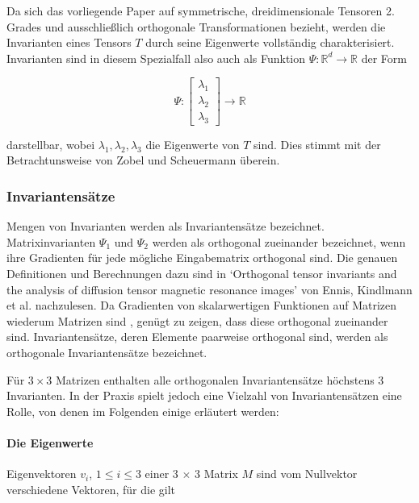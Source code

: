 \documentclass[a4paper,fontsize=12pt,toc=bib,halfparskip]{scrartcl}
\begin{document}
Da sich das vorliegende Paper auf symmetrische, dreidimensionale Tensoren 2. Grades und ausschlie{\ss}lich orthogonale Transformationen bezieht, werden die Invarianten eines Tensors $T$ durch seine Eigenwerte vollst\"andig charakterisiert. Invarianten sind in diesem Spezialfall also auch als Funktion $\Psi: \mathbb{R}^d \rightarrow \mathbb{R}$ der Form

\begin{equation}
	\Psi:
	\begin{bmatrix}
	\lambda_1\\
	\lambda_2\\
	\lambda_3
	\end{bmatrix}
	\rightarrow \mathbb{R}
\end{equation}

darstellbar, wobei $\lambda_1, \lambda_2, \lambda_3$ die Eigenwerte von $T$ sind. Dies stimmt mit der Betrachtunsweise von Zobel und Scheuermann \cite{zobel2017extremal} \"uberein.

\subsubsection{Invariantens\"atze} 
Mengen von Invarianten werden als Invariantens\"atze bezeichnet.
Matrixinvarianten $\Psi_1$ und $\Psi_2$ werden als orthogonal zueinander bezeichnet, wenn ihre Gradienten f\"ur jede m\"ogliche Eingabematrix orthogonal sind. Die genauen Definitionen und Berechnungen dazu sind in `Orthogonal tensor invariants and the analysis of diffusion tensor magnetic resonance images' von Ennis, Kindlmann et al. \cite{ennis2006orthogonal} nachzulesen. Da Gradienten von skalarwertigen Funktionen auf Matrizen wiederum Matrizen sind \cite[S.~137]{ennis2006orthogonal}, gen\"ugt zu zeigen, dass diese orthogonal zueinander sind. Invariantens\"atze, deren Elemente paarweise orthogonal sind, werden als orthogonale Invariantens\"atze bezeichnet.

F\"ur $3\times 3$ Matrizen enthalten alle orthogonalen Invariantens\"atze h\"ochstens 3 Invarianten. In der Praxis spielt jedoch eine Vielzahl von Invariantens\"atzen eine Rolle, von denen im Folgenden einige erl\"autert werden:

\paragraph{Die Eigenwerte}

Eigenvektoren $v_i$, $1\leq i\leq 3$ einer 3 $\times$ 3 Matrix $M$ sind vom Nullvektor verschiedene Vektoren, f\"ur die gilt
\end{document}
